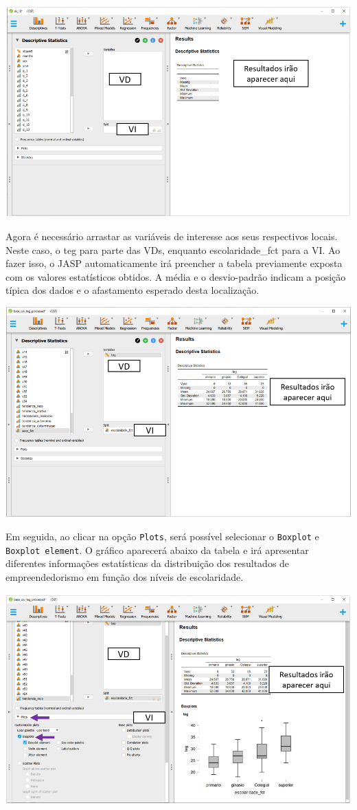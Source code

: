 \documentclass[
]{book}
\begin{document}
\includegraphics{./img/jasp_descriptives2.png}

Agora é necessário arrastar as variáveis de interesse aos seus
respectivos locais. Neste caso, o teg para parte das VDs, enquanto
escolaridade\_fct para a VI. Ao fazer isso, o JASP automaticamente irá
preencher a tabela previamente exposta com os valores estatísticos
obtidos. A média e o desvio-padrão indicam a posição típica dos dados e
o afastamento esperado desta localização.

\includegraphics{./img/cap_anova_descritivo.png}

Em seguida, ao clicar na opção \texttt{Plots}, será possível selecionar
o \texttt{Boxplot} e \texttt{Boxplot\ element}. O gráfico aparecerá
abaixo da tabela e irá apresentar diferentes informações estatísticas da
distribuição dos resultados de empreendedorismo em função dos níveis de
escolaridade.

\includegraphics{./img/cap_anova_descritivo2.png}
\end{document}
